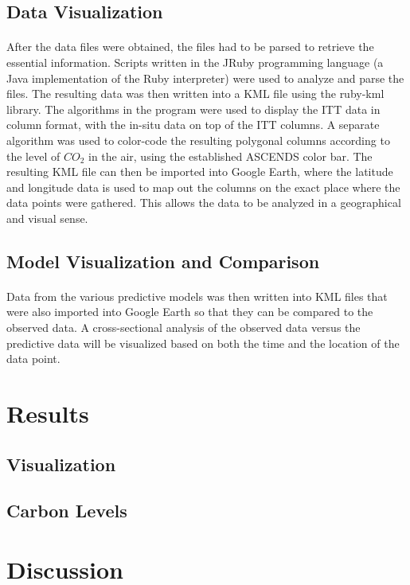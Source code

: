 \documentclass[12pt,letterpaper]{report}
\begin{document}
  \subsection*{Data Visualization}
   \paragraph{}
    After the data files were obtained, the files had to be parsed to retrieve the essential information. Scripts written in the JRuby programming language (a Java implementation of the Ruby interpreter) were used to analyze and parse the files. The resulting data was then written into a KML file using the ruby-kml library. The algorithms in the program were used to display the ITT data in column format, with the in-situ data on top of the ITT columns. A separate algorithm was used to color-code the resulting polygonal columns according to the level of $CO_2$ in the air, using the established ASCENDS color bar. The resulting KML file can then be imported into Google Earth, where the latitude and longitude data is used to map out the columns on the exact place where the data points were gathered. This allows the data to be analyzed in a geographical and visual sense.
  \subsection*{Model Visualization and Comparison}
   \paragraph{}
    Data from the various predictive models was then written into KML files that were also imported into Google Earth so that they can be compared to the observed data. A cross-sectional analysis of the observed data versus the predictive data will be visualized based on both the time and the location of the data point.
 \section*{Results}
  \subsection*{Visualization}
  \subsection*{Carbon Levels}

 \section*{Discussion}
\end{document}
